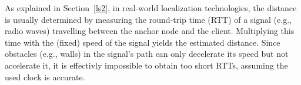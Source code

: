 As explained in Section~\ref{ls2}, in real-world localization technologies, the distance is usually determined by measuring the round-trip time (RTT) of a signal (e.g., radio waves) travelling between the anchor node and the client. Multiplying this time with the (fixed) speed of the signal yields the estimated distance. Since obstacles (e.g., walls) in the signal's path can only decelerate its speed but not accelerate it, it is effectivly impossible to obtain too short RTTs, assuming the used clock is accurate.